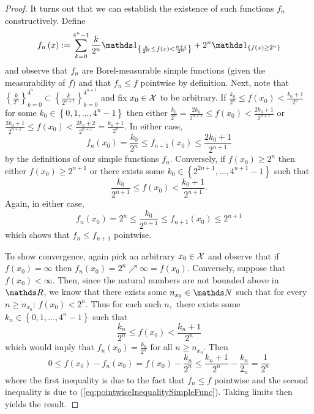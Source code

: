 \begin{proof}
It turns out that we can establish the existence of such functions
$f_{n}$ constructively. Define
\[
f_{n}\left(x\right):=\sum_{k=0}^{4^{n}-1}\frac{k}{2^{n}}\indicate_{\left\{ \frac{k}{2^{n}}\leq f\left(x\right)<\frac{k+1}{2^{n}}\right\} }+2^{n}\indicate_{\left\{ f\left(x\right)\geq2^{n}\right\} }
\]
and observe that $f_{n}$ are Borel-measurable simple functions (given
the measurability of $f$) and that $f_{n}\leq f$ pointwise by definition.
Next, note that $\left\{ \frac{k}{2^{n}}\right\} _{k=0}^{4^{n}}\subset\left\{ \frac{k}{2^{n+1}}\right\} _{k=0}^{4^{n+1}}$
and fix $x_{0}\in\mathcal{X}$ to be arbitrary. If $\frac{k_{0}}{2^{n}}\leq f\left(x_{0}\right)<\frac{k_{0}+1}{2^{n}}$
for some $k_{0}\in\left\{ 0,1,\ldots,4^{n}-1\right\} $ then either
$\frac{k_{0}}{2^{n}}=\frac{2k_{0}}{2^{n+1}}\leq f\left(x_{0}\right)<\frac{2k_{0}+1}{2^{n+1}}$
or $\frac{2k_{0}+1}{2^{n+1}}\leq f\left(x_{0}\right)<\frac{2k_{0}+2}{2^{n+1}}=\frac{k_{0}+1}{2^{n}}$.
In either case,
\[
f_{n}\left(x_{0}\right)=\frac{k_{0}}{2^{n}}\leq f_{n+1}\left(x_{0}\right)\leq\frac{2k_{0}+1}{2^{n+1}}
\]
by the definitions of our simple functions $f_{n}.$ Conversely, if
$f\left(x_{0}\right)\geq2^{n}$ then either $f\left(x_{0}\right)\geq2^{n+1}$
or there exists some $k_{0}\in\left\{ 2^{2n+1},\ldots,4^{n+1}-1\right\} $
such that
\[
\frac{k_{0}}{2^{n+1}}\leq f\left(x_{0}\right)<\frac{k_{0}+1}{2^{n+1}}.
\]
Again, in either case,
\[
f_{n}\left(x_{0}\right)=2^{n}\leq\frac{k_{0}}{2^{n+1}}\leq f_{n+1}\left(x_{0}\right)\leq2^{n+1}
\]
which shows that $f_{n}\leq f_{n+1}$ pointwise.

To show convergence, again pick an arbitrary $x_{0}\in\mathcal{X}$ and observe
that if $f\left(x_{0}\right)=\infty$ then $f_{n}\left(x_{0}\right)=2^{n}\nearrow\infty=f\left(x_{0}\right).$
Conversely, suppose that $f\left(x_{0}\right)<\infty$. Then, since
the natural numbers are not bounded above in $\R$, we know that there
exists some $n_{x_{0}}\in\N$ such that for every $n\geq n_{x_{0}}$:
$f\left(x_{0}\right)<2^{n}$. Thus for each such $n,$ there exists
some $k_{n}\in\left\{ 0,1,\ldots,4^{n}-1\right\} $ such that 
\begin{equation}
\frac{k_{n}}{2^{n}}\leq f\left(x_{0}\right)<\frac{k_{n}+1}{2^{n}}\label{eq:pointwiseInequalitySimpleFunc}
\end{equation}
which would imply that $f_{n}\left(x_{0}\right)=\frac{k_{n}}{2^{n}}$
for all $n\geq n_{x_{0}}.$ Then
\[
0\leq f\left(x_{0}\right)-f_{n}\left(x_{0}\right)=f\left(x_{0}\right)-\frac{k_{n}}{2^{n}}\leq\frac{k_{n}+1}{2^{n}}-\frac{k_{n}}{2_{n}}=\frac{1}{2^{n}}
\]
where the first inequality is due to the fact that $f_{n}\leq f$
pointwise and the second inequality is due to (\ref{eq:pointwiseInequalitySimpleFunc}).
Taking limits then yields the result.
\end{proof}
